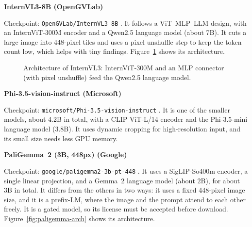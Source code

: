 \documentclass[a4paper,12pt]{report}
\newcommand{\minisection}[1]{%
  \vspace{1ex}
  \noindent\textbf{#1}\par
  \vspace{0.5ex}
}
\begin{document}
\minisection{InternVL3-8B (OpenGVLab)}

Checkpoint: \texttt{OpenGVLab/InternVL3-8B} \cite{zhu2025internvl3}. It follows a ViT--MLP--LLM design, with an InternViT-300M encoder and a Qwen2.5 language model (about 7B). It cuts a large image into 448-pixel tiles and uses a pixel unshuffle step to keep the token count low, which helps with tiny findings. Figure~\ref{fig:internvl-arch} shows its architecture.

\begin{figure}[H]
    \centering
    \caption{Architecture of InternVL3: InternViT-300M and an MLP connector (with pixel unshuffle) feed the Qwen2.5 language model.}
    \label{fig:internvl-arch}
\end{figure}

\minisection{Phi-3.5-vision-instruct (Microsoft)}

Checkpoint: \texttt{microsoft/Phi-3.5-vision-instruct} \cite{abdin2024phi3}. It is one of the smaller models, about 4.2B in total, with a CLIP ViT-L/14 encoder and the Phi-3.5-mini language model (3.8B). It uses dynamic cropping for high-resolution input, and its small size needs less GPU memory.

\minisection{PaliGemma~2 (3B, 448px) (Google)}

Checkpoint: \texttt{google/paligemma2-3b-pt-448} \cite{steiner2024paligemma2}. It uses a SigLIP-So400m encoder, a single linear projection, and a Gemma~2 language model (about 2B), for about 3B in total. It differs from the others in two ways: it uses a fixed 448-pixel image size, and it is a prefix-LM, where the image and the prompt attend to each other freely. It is a gated model, so its license must be accepted before download. Figure~\ref{fig:paligemma-arch} shows its architecture.
\end{document}
